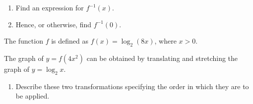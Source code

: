 \documentclass[12pt, twoside]{article}
\begin{document}
\begin{enumerate}[itemsep=0.15cm]
\begin{enumerate}[itemsep=0.15cm]
  \item[(b)] Find an expression for $f^{-1}(x)$.

  \item[(c)] Hence, or otherwise, find $f^{-1}(0)$.
\end{enumerate}


\newpage

The function $f$ is defined as $f(x) = \log_{2}(8x)$, where $x > 0$.

The graph of $y = f(4x^{2})$ can be obtained by translating and
stretching the graph of $y = \log_{2} x$.

\begin{enumerate}[itemsep=0.15cm]
  \item[(d)] Describe these two transformations specifying the order
  in which they are to be applied.
\end{enumerate}


\end{enumerate}
\end{document}

